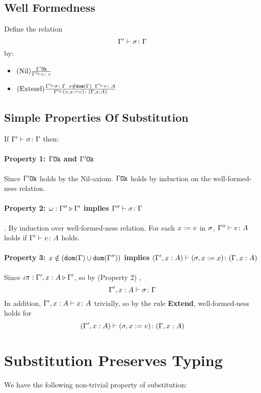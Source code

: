 \documentclass{report}
\begin{document}
\subsection{Well Formedness}
Define the relation $$\Gamma' \vdash \sigma \colon \Gamma$$ by:

\begin{itemize}
    \item $(\text{Nil}) \frac{\Gamma' \texttt{Ok}}{\Gamma' \vdash \diamond \colon \diamond}$
    \item $(\text{Extend}) \frac{
        \Gamma' \vdash \sigma \colon \Gamma
        \;\;
        x\notin\texttt{dom}(\Gamma)
        \;\;
        \Gamma' \vdash v \colon A
    }{
        \Gamma' \vdash (\sigma, x := v) \colon (\Gamma, x: A)
    }$
\end{itemize}
\subsection{Simple Properties Of Substitution}
If $\Gamma' \vdash \sigma \colon \Gamma$ then:

    \paragraph{Property 1: $\Gamma \texttt{Ok}$ and $\Gamma' \texttt{Ok}$}
     Since $\Gamma' \texttt{Ok}$ holds by the Nil-axiom. $\Gamma \texttt{Ok}$ holds by induction on the well-formed-ness relation.
    \paragraph{Property 2: $\omega : \Gamma'' \triangleright \Gamma'$ implies $\Gamma'' \vdash \sigma \colon \Gamma$}. 
    By induction over well-formed-ness relation. For each $x:= v$ in $\sigma$, $\Gamma'' \vdash v \colon A$ holds if $\Gamma' \vdash v \colon A$ holds.
    \paragraph{Property 3: $x \notin (\texttt{dom}(\Gamma) \cup \texttt{dom}(\Gamma''))$ implies $(\Gamma', x: A) \vdash (\sigma, x := x) \colon (\Gamma, x: A)$} 
    Since $\iota\pi : \Gamma',x: A \triangleright \Gamma'$, so by (Property 2) , 
    $$\Gamma', x: A \vdash \sigma \colon \Gamma$$
    In addition, $\Gamma', x: A \vdash x \colon A$ trivially, so by the rule \textbf{Extend}, well-formed-ness holds for
    \begin{equation}
        (\Gamma', x:A) \vdash (\sigma, x:= v) \colon (\Gamma, x: A)
    \end{equation}


\section{Substitution Preserves Typing}
We have the following non-trivial property of substitution:
\end{document}
